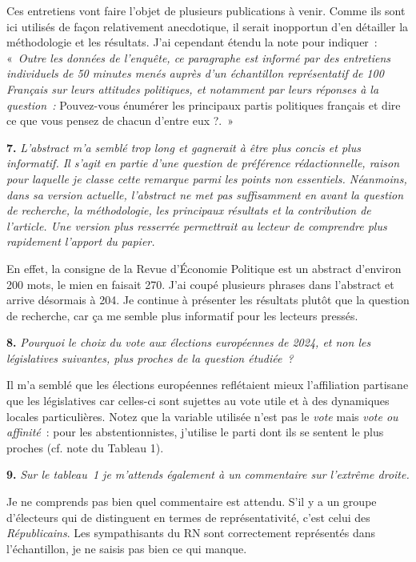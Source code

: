 \documentclass[12pt,french]{article}
\begin{document}
Ces entretiens vont faire l'objet de plusieurs publications à venir. Comme ils sont ici utilisés de façon relativement anecdotique, il serait inopportun d'en détailler la méthodologie et les résultats. J'ai cependant étendu la note pour indiquer~: «~\textit{Outre les données de l'enquête, ce paragraphe est informé par des entretiens individuels de 50 minutes menés auprès d'un échantillon représentatif de 100 Français sur leurs attitudes politiques, et notamment par leurs réponses à la question~:} Pouvez-vous énumérer les principaux partis politiques français et dire ce que vous pensez de chacun d'entre eux ?.~»

\bigskip
\noindent\textbf{7.} \textit{L'abstract m'a semblé trop long et gagnerait à être plus concis et plus informatif. Il s'agit en partie d'une question de préférence rédactionnelle, raison pour laquelle je classe cette remarque parmi les points non essentiels. Néanmoins, dans sa version actuelle, l'abstract ne met pas suffisamment en avant la question de recherche, la méthodologie, les principaux résultats et la contribution de l'article. Une version plus resserrée permettrait au lecteur de comprendre plus rapidement l'apport du papier.}

En effet, la consigne de la Revue d'Économie Politique est un abstract d'environ 200 mots, le mien en faisait 270. J'ai coupé plusieurs phrases dans l'abstract et arrive désormais à 204. Je continue à présenter les résultats plutôt que la question de recherche, car ça me semble plus informatif pour les lecteurs pressés. 

\bigskip
\noindent\textbf{8.} \textit{Pourquoi le choix du vote aux élections européennes de 2024, et non les législatives suivantes, plus proches de la question étudiée~?}

Il m'a semblé que les élections européennes reflétaient mieux l'affiliation partisane que les législatives car celles-ci sont sujettes au vote utile et à des dynamiques locales particulières. Notez que la variable utilisée n'est pas le \textit{vote} mais \textit{vote ou affinité}~: pour les abstentionnistes, j'utilise le parti dont ils se sentent le plus proches (cf. note du Tableau 1). 

\bigskip
\noindent\textbf{9.} \textit{Sur le tableau~1 je m'attends également à un commentaire sur l'extrême droite.}

Je ne comprends pas bien quel commentaire est attendu. S'il y a un groupe d'électeurs qui de distinguent en termes de représentativité, c'est celui des \textit{Républicains}. Les sympathisants du RN sont correctement représentés dans l'échantillon, je ne saisis pas bien ce qui manque. 
\end{document}
